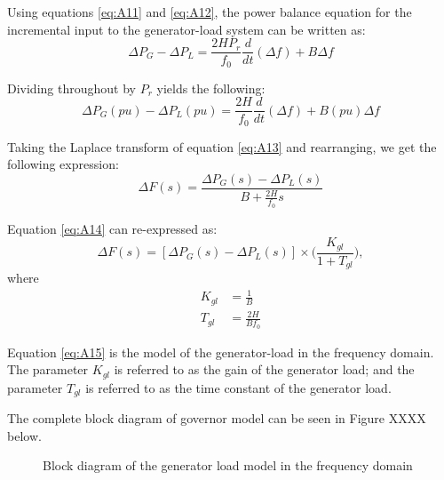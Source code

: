 Using equations \ref{eq:A11} and \ref{eq:A12}, the power balance equation for the incremental input to the generator-load system can be written as:
\begin{equation}
	\Delta P_G - \Delta P_L = \frac{2 H P_r}{f_0} \frac{d}{dt} (\Delta f) + B \Delta f
\end{equation}

Dividing throughout by $P_r$ yields the following:
\begin{equation}
	\Delta P_G(pu) - \Delta P_L(pu) = \frac{2 H}{f_0} \frac{d}{dt} (\Delta f) + B(pu) \Delta f \label{eq:A13}
\end{equation}

Taking the Laplace transform of equation \ref{eq:A13} and rearranging, we get the following expression:
\begin{equation}
	\Delta F(s) = \frac{\Delta P_G(s) - \Delta P_L(s)}{B + \frac{2H}{f_0}s} \label{eq:A14}
\end{equation}

Equation \ref{eq:A14} can re-expressed as:
\begin{equation}
	\Delta F(s) = [\Delta P_G(s) - \Delta P_L(s)] \times \bigg( \frac{K_{gl}}{1 + T_{gl}} \bigg), \label{eq:A15}
\end{equation}
where
\begin{align}
K_{gl} &= \frac{1}{B} \\
T_{gl} &= \frac{2H}{B f_0}
\end{align}

Equation \ref{eq:A15} is the model of the generator-load in the frequency domain. The parameter $K_{gl}$ is referred to as the gain of the generator load; and the parameter $T_{gl}$ is referred to as the time constant of the generator load.

The complete block diagram of governor model can be seen in Figure XXXX below.

\begin{figure}[h]
	\centering
	
	\caption{Block diagram of the generator load model in the frequency domain}
	\label{fig:A06_generator_load_model}
\end{figure}